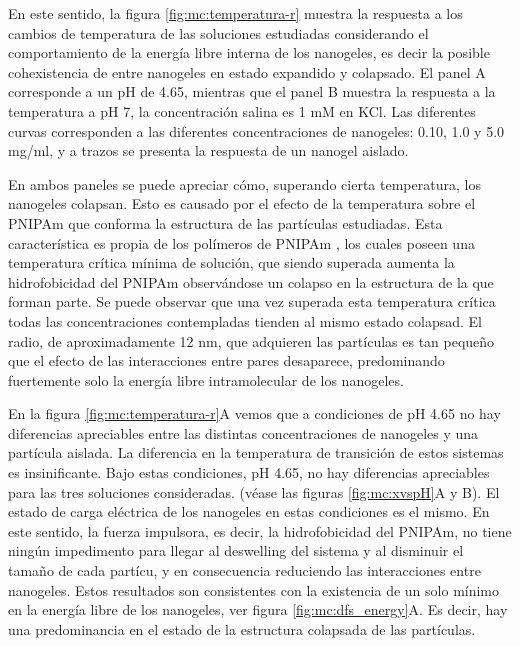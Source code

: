 	En este sentido, la figura \ref{fig:mc:temperatura-r} muestra la respuesta a los cambios de temperatura de las soluciones estudiadas considerando el comportamiento de la energ\'ia libre interna de los nanogeles, es decir la posible cohexistencia de entre nanogeles en estado expandido y colapsado. El panel A corresponde a un pH de 4.65, mientras que el panel B muestra la respuesta a la temperatura a pH 7, la concentraci\'on salina es 1 mM en KCl. Las diferentes curvas corresponden a las diferentes concentraciones de nanogeles: 0.10, 1.0 y 5.0 mg/ml, y a trazos se presenta la respuesta de un nanogel aislado.

En ambos paneles se puede apreciar c\'omo, superando cierta temperatura, los nanogeles colapsan. Esto es causado por el efecto de la temperatura sobre el PNIPAm que conforma la estructura de las part\'iculas estudiadas. Esta caracter\'istica es propia de los pol\'imeros de PNIPAm \cite{perez2021thermodynamic}, los cuales poseen una temperatura cr\'itica m\'inima de soluci\'on, que siendo superada aumenta la hidrofobicidad del PNIPAm observ\'andose un colapso en la estructura de la que forman parte. Se puede observar que una vez superada esta temperatura cr\'itica todas las concentraciones contempladas tienden al mismo estado colapsad. El radio, de aproximadamente 12 nm, que adquieren las part\'iculas es tan peque\~no que el efecto de las interacciones entre pares desaparece, predominando fuertemente solo la energ\'ia libre intramolecular de los nanogeles.

En la figura \ref{fig:mc:temperatura-r}A vemos que a condiciones de pH 4.65 no hay diferencias apreciables entre las distintas concentraciones de nanogeles y una part\'icula aislada. La diferencia en la temperatura de transici\'on de estos sistemas es insinificante. Bajo estas condiciones, pH 4.65, no hay diferencias apreciables para las tres soluciones consideradas. (v\'ease las figuras \ref{fig:mc:xvspH}A y B). El estado de carga el\'ectrica de los nanogeles en estas condiciones es el mismo. En este sentido, la fuerza impulsora, es decir, la hidrofobicidad del PNIPAm, no tiene ning\'un impedimento para llegar al deswelling del sistema y al disminuir el tama\~no de cada part\'icu, y en consecuencia reduciendo las interacciones entre nanogeles. Estos resultados son consistentes con la existencia de un solo m\'inimo en la energ\'ia libre de los nanogeles, ver figura \ref{fig:mc:dfs_energy}A. Es decir, hay una predominancia en el estado de la estructura colapsada de las part\'iculas.
	
